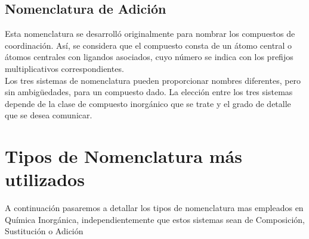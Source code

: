 \documentclass[11pt,fleqn]{book} %
\begin{document}
\subsection{Nomenclatura de Adición}
Esta nomenclatura se desarrolló originalmente para nombrar los compuestos de coordinación. Así, se considera que el compuesto consta de un átomo central o átomos centrales con ligandos asociados, cuyo número se indica con los prefijos multiplicativos correspondientes.\\
Los tres sistemas de nomenclatura pueden proporcionar nombres diferentes, pero sin  ambigüedades, para un compuesto dado. La elección entre los tres sistemas depende de la clase de compuesto inorgánico que se trate y el grado de detalle que se desea comunicar.
\section{Tipos de Nomenclatura más utilizados}
A continuación pasaremos a detallar los tipos de nomenclatura mas empleados en Química Inorgánica, independientemente que estos sistemas sean de Composición, Sustitución o Adición\\
\end{document}
